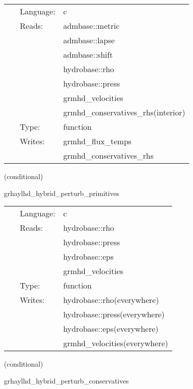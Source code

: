 \documentclass{article}
\begin{document}
 \begin{tabular*}{160mm}{cll} 
~ & Language:  & c \\ 
~ & Reads:  & admbase::metric \\ 
~& ~ &admbase::lapse\\ 
~& ~ &admbase::shift\\ 
~& ~ &hydrobase::rho\\ 
~& ~ &hydrobase::press\\ 
~& ~ &grmhd\_velocities\\ 
~& ~ &grmhd\_conservatives\_rhs(interior)\\ 
~ & Type:  & function \\ 
~ & Writes:  & grmhd\_flux\_temps \\ 
~& ~ &grmhd\_conservatives\_rhs\\ 
\end{tabular*} 


\vspace{5mm}

   (conditional) 

\hspace{5mm} grhaylhd\_hybrid\_perturb\_primitives 

\hspace{5mm}{\it hybrid version of grhaylhd\_perturb\_primitives } 


\hspace{5mm}

 \begin{tabular*}{160mm}{cll} 
~ & Language:  & c \\ 
~ & Reads:  & hydrobase::rho \\ 
~& ~ &hydrobase::press\\ 
~& ~ &hydrobase::eps\\ 
~& ~ &grmhd\_velocities\\ 
~ & Type:  & function \\ 
~ & Writes:  & hydrobase::rho(everywhere) \\ 
~& ~ &hydrobase::press(everywhere)\\ 
~& ~ &hydrobase::eps(everywhere)\\ 
~& ~ &grmhd\_velocities(everywhere)\\ 
\end{tabular*} 


\vspace{5mm}

   (conditional) 

\hspace{5mm} grhaylhd\_hybrid\_perturb\_conservatives 
\end{document}
